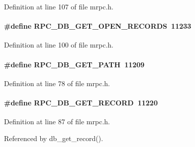 Definition at line 107 of file mrpc.h.
\paragraph[{RPC\_\-DB\_\-GET\_\-OPEN\_\-RECORDS}]{\setlength{\rightskip}{0pt plus 5cm}\#define RPC\_\-DB\_\-GET\_\-OPEN\_\-RECORDS~11233}\hfill\label{group__mrpcdefineh_gaeeb4e8c8ada85be560a691277ed41245}

\begin{DoxyItemize}
\item 
\end{DoxyItemize}

Definition at line 100 of file mrpc.h.
\paragraph[{RPC\_\-DB\_\-GET\_\-PATH}]{\setlength{\rightskip}{0pt plus 5cm}\#define RPC\_\-DB\_\-GET\_\-PATH~11209}\hfill\label{group__mrpcdefineh_gadc10af16548bbb48efe1ca5317f8b330}

\begin{DoxyItemize}
\item 
\end{DoxyItemize}

Definition at line 78 of file mrpc.h.
\paragraph[{RPC\_\-DB\_\-GET\_\-RECORD}]{\setlength{\rightskip}{0pt plus 5cm}\#define RPC\_\-DB\_\-GET\_\-RECORD~11220}\hfill\label{group__mrpcdefineh_gafffa6050c2cbd0f3597fa57462178825}

\begin{DoxyItemize}
\item 
\end{DoxyItemize}

Definition at line 87 of file mrpc.h.

Referenced by db\_\-get\_\-record().
